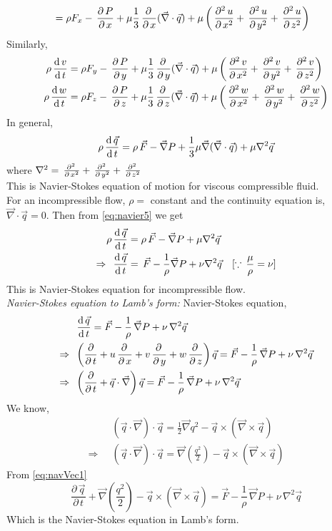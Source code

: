 \documentclass[../main-sheet.tex]{subfiles}
\begin{document}
\begin{soln}
\begin{align*}
    &=\rho F_x-\,\frac{\partial\, P}{\partial\, x}
    +\mu\frac{1}{3}\,\frac{\partial\, }{\partial\, x}(\vec{\nabla}\cdot \vec{q})+
    \mu\left(\,\frac{\partial^{2}\, u}{\partial\, x^{2}}+\,\frac{\partial^{2}\, u}{\partial\,y^{2}}+\,\frac{\partial^{2}\, u}{\partial\,z^{2}}\right)
\end{align*}
Similarly,
\begin{align*}
    \rho\,\frac{\mathrm{d}\,v}{\mathrm{d}\,t}&=\rho F_y-\,\frac{\partial\, P}{\partial\, y}+\mu\frac{1}{3}\,\frac{\partial\, }{\partial\, y}(\vec{\nabla}\cdot \vec{q})+\mu\left(\,\frac{\partial^{2}\, v}{\partial\, x^{2}}+\,\frac{\partial^{2}\, v}{\partial\,y^{2}}+\,\frac{\partial^{2}\, v}{\partial\,z^{2}}\right)\\
    \rho\,\frac{\mathrm{d}\,w}{\mathrm{d}\,t}&=\rho F_z-\,\frac{\partial\, P}{\partial\, z}+\mu\frac{1}{3}\,\frac{\partial\, }{\partial\, z}(\vec{\nabla}\cdot \vec{q})+\mu\left(\,\frac{\partial^{2}\, w}{\partial\, x^{2}}+\,\frac{\partial^{2}\, w}{\partial\,y^{2}}+\,\frac{\partial^{2}\, w}{\partial\,z^{2}}\right)
\end{align*}
\newpage
In general,
\begin{equation}
    \rho\,\frac{\mathrm{d}\,\vec{q}}{\mathrm{d}\,t}=\rho \,\vec{F}-\vec{\nabla}{P}+\frac{1}{3}\mu\vec{\nabla}(\vec{\nabla}\cdot \vec{q})+\mu \nabla^2\vec{q}
    \label{eq:navier5}
\end{equation}
where \(\nabla^2=\,\frac{\partial^{2}\, }{\partial\, x^{2}}+\,\frac{\partial^{2}\, }{\partial\,y^{2}}+\,\frac{\partial^{2}\, }{\partial\,z^{2}}\)\\

This is Navier-Stokes equation of motion for viscous compressible fluid.\\

For an incompressible flow, \(\rho=\) constant and the continuity equation is, \(\vec{\nabla}\cdot\vec{q}=0\). Then from \eqref{eq:navier5} we get
\begin{align*}
    \rho\,\frac{\mathrm{d}\,\vec{q}}{\mathrm{d}\,t}&=\rho \,\vec{F}-\vec{\nabla}{P}+\mu \nabla^2\vec{q}\\
    \Rightarrow\;\,\frac{\mathrm{d}\,\vec{q}}{\mathrm{d}\,t}&=\,\vec{F}-\frac{1}{\rho}\vec{\nabla}{P}+\nu \nabla^2\vec{q}\quad[\because\,\frac{\mu}{\rho}=\nu]
\end{align*}
This is Navier-Stokes equation for incompressible flow.\\

\emph{Navier-Stokes equation to Lamb's form:} Navier-Stokes equation,
\begin{align}
    & \,\frac{\mathrm{d}\,\vec{q}}{\mathrm{d}\,t}=\vec{F}-\frac{1}{\rho}\,\vec{\nabla}P+\nu\,\nabla^2\vec{q}\notag\\
    \Rightarrow\;\;& \left( \frac{\partial}{\partial\,t}+u\,\frac{\partial\, }{\partial\, x}+v\,\frac{\partial\, }{\partial\, y}+w\,\frac{\partial\, }{\partial\, z} \right)\vec{q}=\vec{F}-\frac{1}{\rho}\,\vec{\nabla}P+\nu\,\nabla^2\vec{q}\notag\\
    \Rightarrow\;\;& \left( \frac{\partial}{\partial\,t}+\vec{q}\cdot\vec{\nabla}\right)\vec{q}=\vec{F}-\frac{1}{\rho}\,\vec{\nabla}P+\nu\,\nabla^2\vec{q}\label{eq:navVec1}
\end{align}
We know,
\begin{align*}
    & (\vec{q}\cdot\vec{\nabla})\cdot\vec{q}=\frac{1}{2}\vec{\nabla}q^2-\vec{q}\times (\vec{\nabla}\times\vec{q})\\
    \Rightarrow\;\;& (\vec{q}\cdot\vec{\nabla})\cdot\vec{q}=\vec{\nabla}\left(\frac{q^2}{2}\right)-\vec{q}\times (\vec{\nabla}\times\vec{q})
\end{align*}
From \eqref{eq:navVec1}
\[
    \frac{\partial\,\vec{q}}{\partial\,t}+\vec{\nabla}\left(\frac{q^2}{2}\right)-\vec{q}\times (\vec{\nabla}\times\vec{q})=\vec{F}-\frac{1}{\rho}\,\vec{\nabla}P+\nu\,\nabla^2\vec{q}
\]
Which is the Navier-Stokes equation in Lamb's form. 
\end{soln}
\end{document}
